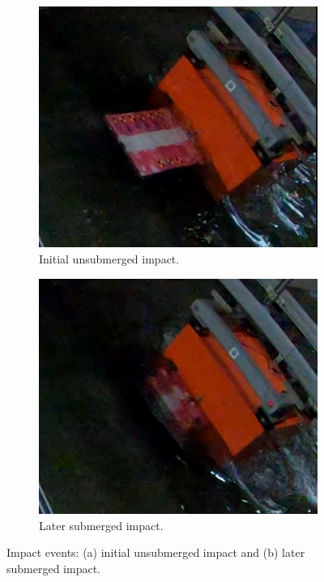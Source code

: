 \documentclass{article}
\begin{document}
\begin{figure}[htbp]
    \centering
    \begin{subfigure}[b]{0.48\textwidth}
        \centering
        \includegraphics[width=\textwidth]{first_impact.jpg}
        \caption{Initial unsubmerged impact.}
        \label{fig:first_impact}
    \end{subfigure}
    \hfill
    
    \begin{subfigure}[b]{0.48\textwidth}
        \centering
        \includegraphics[width=\textwidth]{second_impact.jpg}
        \caption{Later submerged impact.}
        \label{fig:second_impact}
    \end{subfigure}
    \caption{Impact events: (a) initial unsubmerged impact and (b) later submerged impact.}
    \label{fig:impact_combined}
\end{figure}
\end{document}
